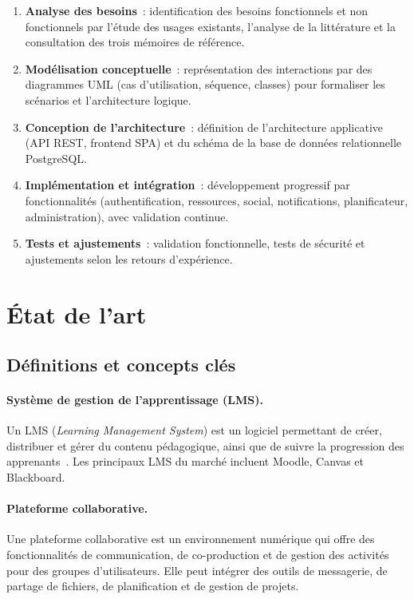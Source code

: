 ﻿\documentclass[12pt,a4paper,oneside]{report}
\begin{document}
\begin{enumerate}
  \item \textbf{Analyse des besoins}~: identification des besoins fonctionnels et non fonctionnels par l'\'etude des usages existants, l'analyse de la litt\'erature et la consultation des trois m\'emoires de r\'ef\'erence.
  \item \textbf{Mod\'elisation conceptuelle}~: repr\'esentation des interactions par des diagrammes UML (cas d'utilisation, s\'equence, classes) pour formaliser les sc\'enarios et l'architecture logique.
  \item \textbf{Conception de l'architecture}~: d\'efinition de l'architecture applicative (API REST, frontend SPA) et du sch\'ema de la base de donn\'ees relationnelle PostgreSQL.
  \item \textbf{Impl\'ementation et int\'egration}~: d\'eveloppement progressif par fonctionnalit\'es (authentification, ressources, social, notifications, planificateur, administration), avec validation continue.
  \item \textbf{Tests et ajustements}~: validation fonctionnelle, tests de s\'ecurit\'e et ajustements selon les retours d'exp\'erience.
\end{enumerate}

\section{\'Etat de l'art}
\label{sec:etat_art}

\subsection{D\'efinitions et concepts cl\'es}

\paragraph{Syst\`eme de gestion de l'apprentissage (LMS).}
Un LMS (\textit{Learning Management System}) est un logiciel permettant de cr\'eer, distribuer et g\'erer du contenu p\'edagogique, ainsi que de suivre la progression des apprenants~\cite{moodle_overview_2026}. Les principaux LMS du march\'e incluent Moodle, Canvas et Blackboard.

\paragraph{Plateforme collaborative.}
Une plateforme collaborative est un environnement num\'erique qui offre des fonctionnalit\'es de communication, de co-production et de gestion des activit\'es pour des groupes d'utilisateurs. Elle peut int\'egrer des outils de messagerie, de partage de fichiers, de planification et de gestion de projets.
\end{document}
